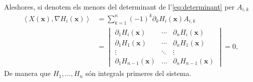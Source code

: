 \documentclass[12pt]{article}
\renewcommand{\vec}[1]{\mathbf{#1}}
\newcommand{\inn}[2]{\left\langle #1 , #2 \right\rangle}
\begin{document}
Aleshores, si denotem els menors del determinant de l'\cref{eq:determinant} per \( A_{i,k} \)
\begin{align*}
	\inn{X(\vec{x})}{\nabla H_i(\vec{x})} & = \sum_{k = 1}^n (-1)^k \partial_k H_i(\vec{x}) A_{i,k} \\
																				& = \begin{vmatrix}
		\partial_1 H_i(\vec{x}) & \cdots & \partial_n H_i(\vec{x}) \\
		\partial_1 H_1(\vec{x}) & \cdots & \partial_n H_1(\vec{x}) \\
		\vdots & \ddots & \vdots \\ 
		\partial_1 H_{n-1}(\vec{x}) & \dots & \partial_n H_{n-1}(\vec{x}) 
	\end{vmatrix} = 0,
\end{align*}
De manera que \( H_1, \dots, H_n \) són integrals primeres del sistema.
\end{document}

